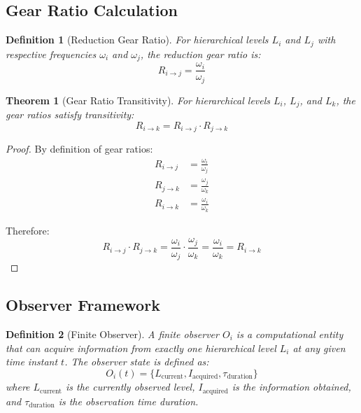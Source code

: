 \documentclass[12pt,a4paper]{article}
\newtheorem{theorem}{Theorem}
\newtheorem{definition}{Definition}
\begin{document}
\subsection{Gear Ratio Calculation}

\begin{definition}[Reduction Gear Ratio]
For hierarchical levels $L_i$ and $L_j$ with respective frequencies $\omega_i$ and $\omega_j$, the reduction gear ratio is:
\begin{equation}
R_{i \to j} = \frac{\omega_i}{\omega_j}
\end{equation}
\end{definition}

\begin{theorem}[Gear Ratio Transitivity]
For hierarchical levels $L_i$, $L_j$, and $L_k$, the gear ratios satisfy transitivity:
\begin{equation}
R_{i \to k} = R_{i \to j} \cdot R_{j \to k}
\end{equation}
\end{theorem}

\begin{proof}
By definition of gear ratios:
\begin{align}
R_{i \to j} &= \frac{\omega_i}{\omega_j} \\
R_{j \to k} &= \frac{\omega_j}{\omega_k} \\
R_{i \to k} &= \frac{\omega_i}{\omega_k}
\end{align}

Therefore:
\begin{equation}
R_{i \to j} \cdot R_{j \to k} = \frac{\omega_i}{\omega_j} \cdot \frac{\omega_j}{\omega_k} = \frac{\omega_i}{\omega_k} = R_{i \to k}
\end{equation}
\end{proof}

\subsection{Observer Framework}

\begin{definition}[Finite Observer]
A finite observer $O_i$ is a computational entity that can acquire information from exactly one hierarchical level $L_i$ at any given time instant $t$. The observer state is defined as:
\begin{equation}
O_i(t) = \{L_{\text{current}}, I_{\text{acquired}}, \tau_{\text{duration}}\}
\end{equation}
where $L_{\text{current}}$ is the currently observed level, $I_{\text{acquired}}$ is the information obtained, and $\tau_{\text{duration}}$ is the observation time duration.
\end{definition}
\end{document}
